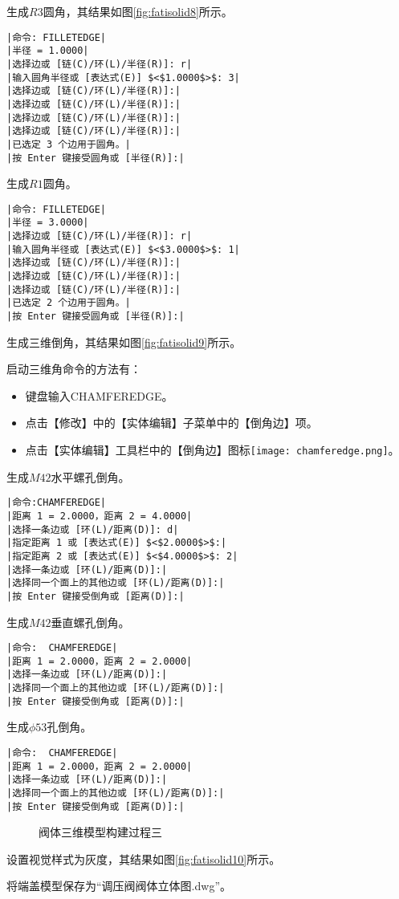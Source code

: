 \begin{procedure}
生成$R3$圆角，其结果如图\ref{fig:fatisolid8}所示。
\begin{lstlisting}
|命令: FILLETEDGE|
|半径 = 1.0000|
|选择边或 [链(C)/环(L)/半径(R)]: r|
|输入圆角半径或 [表达式(E)] $<$1.0000$>$: 3|
|选择边或 [链(C)/环(L)/半径(R)]:|
|选择边或 [链(C)/环(L)/半径(R)]:|
|选择边或 [链(C)/环(L)/半径(R)]:|
|选择边或 [链(C)/环(L)/半径(R)]:|
|已选定 3 个边用于圆角。|
|按 Enter 键接受圆角或 [半径(R)]:|
\end{lstlisting}
生成$R1$圆角。
\begin{lstlisting}
|命令: FILLETEDGE|
|半径 = 3.0000|
|选择边或 [链(C)/环(L)/半径(R)]: r|
|输入圆角半径或 [表达式(E)] $<$3.0000$>$: 1|
|选择边或 [链(C)/环(L)/半径(R)]:|
|选择边或 [链(C)/环(L)/半径(R)]:|
|选择边或 [链(C)/环(L)/半径(R)]:|
|已选定 2 个边用于圆角。|
|按 Enter 键接受圆角或 [半径(R)]:|
\end{lstlisting}
\item 生成三维倒角，其结果如图\ref{fig:fatisolid9}所示。

启动三维角命令的方法有：
\begin{itemize}
\item 键盘输入CHAMFEREDGE。
\item 点击【修改】中的【实体编辑】子菜单中的【倒角边】项。
\item 点击【实体编辑】工具栏中的【倒角边】图标\texttt{[image: chamferedge.png]}。
\end{itemize}
生成$M42$水平螺孔倒角。
\begin{lstlisting}
|命令:CHAMFEREDGE|
|距离 1 = 2.0000，距离 2 = 4.0000|
|选择一条边或 [环(L)/距离(D)]: d|
|指定距离 1 或 [表达式(E)] $<$2.0000$>$:|
|指定距离 2 或 [表达式(E)] $<$4.0000$>$: 2|
|选择一条边或 [环(L)/距离(D)]:|
|选择同一个面上的其他边或 [环(L)/距离(D)]:|
|按 Enter 键接受倒角或 [距离(D)]:|
\end{lstlisting}
生成$M42$垂直螺孔倒角。
\begin{lstlisting}
|命令:  CHAMFEREDGE|
|距离 1 = 2.0000，距离 2 = 2.0000|
|选择一条边或 [环(L)/距离(D)]:|
|选择同一个面上的其他边或 [环(L)/距离(D)]:|
|按 Enter 键接受倒角或 [距离(D)]:|
\end{lstlisting}
生成$\phi 53$孔倒角。
\begin{lstlisting}
|命令:  CHAMFEREDGE|
|距离 1 = 2.0000，距离 2 = 2.0000|
|选择一条边或 [环(L)/距离(D)]:|
|选择同一个面上的其他边或 [环(L)/距离(D)]:|
|按 Enter 键接受倒角或 [距离(D)]:|
\end{lstlisting}
\begin{figure}[htbp]
\centering
{}\hspace{30pt}
\caption{阀体三维模型构建过程三}
\end{figure}
\item 设置视觉样式为灰度，其结果如图\ref{fig:fatisolid10}所示。
\item 将端盖模型保存为“调压阀阀体立体图.dwg”。
\end{procedure}
\endinput